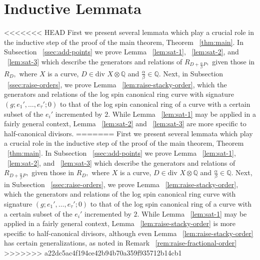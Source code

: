 \documentclass{amsart}
\theoremstyle{plain}
\theoremstyle{definition}
\theoremstyle{remark}
\numberwithin{equation}{section}
\newcommand\BQ{{\mathbb Q}}
\newcommand \di{\text{div }}
\begin{document}
\section{Inductive Lemmata}
\label{sec:induction}
<<<<<<< HEAD
First we present several lemmata which play a crucial role in the inductive step of the proof of the main theorem, Theorem ~\ref{thm:main}. In Subsection ~\ref{ssec:add-points} we prove Lemma ~\ref{lem:sat-1}, ~\ref{lem:sat-2}, and ~\ref{lem:sat-3} which describe the generators and relations of $R_{D + \frac{\alpha}{\beta}P},$ given those in $R_D,$ where $X$ is a curve, $D \in \di X \otimes \BQ$ and  $\frac{\alpha}{\beta} \in \BQ.$ Next, in Subsection ~\ref{ssec:raise-orders}, we prove Lemma ~\ref{lem:raise-stacky-order}, which the generators and relations of the log spin canonical ring curve with signature $(g; e_1', \ldots, e_\tau'; 0)$ to that of the log spin canonical ring of a curve with a certain subset of the $e_i'$ incremented by $2$. While Lemma ~\ref{lem:sat-1} may be applied in a fairly general context, Lemma ~\ref{lem:sat-2} and ~\ref{lem:sat-3} are more specific to half-canonical divisors.
=======
First we present several lemmata which play a crucial role in the inductive step of the proof of the main theorem, Theorem ~\ref{thm:main}. In Subsection ~\ref{ssec:add-points} we prove Lemma ~\ref{lem:sat-1}, ~\ref{lem:sat-2}, and ~\ref{lem:sat-3} which describe the generators and relations of $R_{D + \frac{\alpha}{\beta}P},$ given those in $R_D,$ where $X$ is a curve, $D \in \di X \otimes \BQ$ and  $\frac{\alpha}{\beta} \in \BQ.$ Next, in Subsection ~\ref{ssec:raise-orders}, we prove Lemma ~\ref{lem:raise-stacky-order}, which the generators and relations of the log spin canonical ring curve with signature $(g; e_1', \ldots, e_\tau'; 0)$ to that of the log spin canonical ring of a curve with a certain subset of the $e_i'$ incremented by $2$. While Lemma ~\ref{lem:sat-1} may be applied in a fairly general context, Lemma ~\ref{lem:raise-stacky-order} is more specific to half-canonical divisors, although even Lemma ~\ref{lem:raise-stacky-order} has certain generalizations, as noted in Remark ~\ref{rem:raise-fractional-order}
>>>>>>> a22dc5ac4f194ce42b94b70a359f935712b14cb1

%
\end{document}
